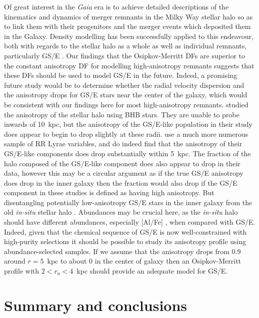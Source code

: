 Of great interest in the \textit{Gaia} era is to achieve detailed descriptions of the kinematics and dynamics of merger remnants in the Milky Way stellar halo so as to link them with their progenitors and the merger events which deposited them in the Galaxy. Density modelling has been successfully applied to this endeavour, both with regards to the stellar halo as a whole \parencite[e.g. ][]{deason19,mackereth20} as well as individual remnants, particularly GS/E \parencite[e.g. ][]{han22,lane23}. Our findings that the Osipkov-Merritt DFs are superior to the constant anisotropy DF for modelling high-anisotropy remnants suggests that these DFs should be used to model GS/E in the future. Indeed, a promising future study would be to determine whether the radial velocity dispersion and the anisotropy drops for GS/E stars near the center of the galaxy, which would be consistent with our findings here for most high-anisotropy remnants. \textcite{lancaster19} studied the anisotropy of the stellar halo using BHB stars. They are unable to probe inwards of 10~kpc, but the anisotropy of the GS/E-like population in their study does appear to begin to drop slightly at these radii. \textcite{iorio21} use a much more numerous sample of RR Lyrae variables, and do indeed find that the anisotropy of their GS/E-like components does drop substantially within 5~kpc. The fraction of the halo composed of the GS/E-like component does also appear to drop in their data, however this may be a circular argument as if the true GS/E anisotropy does drop in the inner galaxy then the fraction would also drop if the GS/E component in these studies is defined as having high anisotropy. But disentangling potentially low-anisotropy GS/E stars in the inner galaxy from the old \textit{in-situ} stellar halo \parencite[e.g.][]{belokurov22,rix22}. Abundances may be crucial here, as the \textit{in-situ} halo should have different abundances, especially [Al/Fe] \parencite[see][]{belokurov22}, when compared with GS/E. Indeed, given that the chemical sequence of GS/E is now well-constrained with high-purity selections \parencite[e.g.][]{lane23} it should be possible to study its anisotropy profile using abundance-selected samples. If we assume that the anisotropy drops from 0.9 around $r=5$~kpc to about 0 in the center of galaxy then an Osipkov-Merritt profile with $2 < r_{a} < 4$~kpc should provide an adequate model for GS/E. 

\section{Summary and conclusions}
\label{ch4:sec:summary-conclusions}

